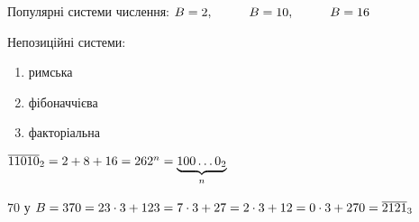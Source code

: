 \documentclass[a4paper,12pt]{bookest}
\newcommand\tab[1][1cm]{\hspace*{#1}}
\begin{document}
Популярні системи числення: 
$B=2,\tab B=10,\tab B=16\\$

Непозиційні системи:\begin{enumerate}
	\item римська 
	\item фібоначчієва
	\item факторіальна
\end{enumerate}

\begin{example}
	$\overline{11010}_2=2+8+16=26\\ 2^n=\underbrace{100\dots0_2}_{n}$
\end{example}
\begin{example}
	$70$ у $B=3\\70=23\cdot 3+1\\23=7\cdot 3+2\\7=2\cdot 3+1\\2=0\cdot3+2\\70=\overline{2121}_3$
\end{example}
\end{document}
